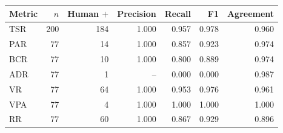 \begin{tabular}{@{}lrrrrrr@{}}
\toprule
Metric & $n$ & Human $+$ & Precision & Recall & F1 & Agreement \\
\midrule
TSR & 200 & 184 & 1.000 & 0.957 & 0.978 & 0.960 \\
PAR & 77 & 14 & 1.000 & 0.857 & 0.923 & 0.974 \\
BCR & 77 & 10 & 1.000 & 0.800 & 0.889 & 0.974 \\
ADR & 77 & 1 & -- & 0.000 & 0.000 & 0.987 \\
VR & 77 & 64 & 1.000 & 0.953 & 0.976 & 0.961 \\
VPA & 77 & 4 & 1.000 & 1.000 & 1.000 & 1.000 \\
RR & 77 & 60 & 1.000 & 0.867 & 0.929 & 0.896 \\
\bottomrule
\end{tabular}
